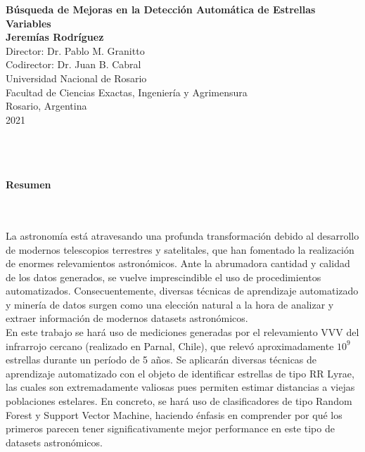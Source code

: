 

\newpage


\begin{center}
\thispagestyle{empty} 
\vspace*{0cm} 

\begin{figure}
\centering%
%
\end{figure}

\textbf{\huge
Búsqueda de Mejoras en la Detección Automática de Estrellas Variables}\\[1.5cm]
\large\textbf{Jeremías Rodríguez} \\ [2.0cm]

Director: Dr. Pablo M. Granitto\\ [0.5cm]

Codirector: Dr. Juan B. Cabral\\ [2.5cm]

Universidad Nacional de Rosario\\
Facultad de Ciencias Exactas, Ingeniería y Agrimensura\\ [1.0cm]
Rosario, Argentina\\
2021\\
\end{center}


\newpage{\pagestyle{empty}\cleardoublepage}
\newpage{\pagestyle{empty}\cleardoublepage}

\newpage
\thispagestyle{empty} \textbf{}\normalsize
\\\\\\%
\textbf{\LARGE Resumen}
\\\\

La astronomía está atravesando una profunda transformación debido al desarrollo de modernos telescopios terrestres y satelitales, que han fomentado la realización de enormes relevamientos astronómicos. Ante la abrumadora cantidad y calidad de los datos generados, se vuelve imprescindible el uso de procedimientos automatizados. Consecuentemente, diversas técnicas de aprendizaje automatizado y minería de datos surgen como una elección natural a la hora de analizar y extraer información de modernos datasets astronómicos. \\

En este trabajo se hará uso de mediciones generadas por el relevamiento VVV del infrarrojo cercano (realizado en Parnal, Chile), que relevó aproximadamente $10^9$ estrellas durante un período de 5 años. Se aplicarán diversas técnicas de aprendizaje automatizado con el objeto de identificar estrellas de tipo RR Lyrae, las cuales son extremadamente valiosas pues permiten estimar distancias a viejas poblaciones estelares. En concreto, se hará uso de clasificadores de tipo Random Forest y Support Vector Machine, haciendo énfasis en comprender por qué los primeros parecen tener significativamente mejor performance en este tipo de datasets astronómicos.\\


